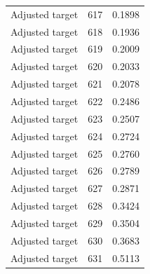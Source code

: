 \begin{table}[htbp]
\begin{tabular}{lll}
Adjusted target & 617 & 0.1898 \\
Adjusted target & 618 & 0.1936 \\
Adjusted target & 619 & 0.2009 \\
Adjusted target & 620 & 0.2033 \\
Adjusted target & 621 & 0.2078 \\
Adjusted target & 622 & 0.2486 \\
Adjusted target & 623 & 0.2507 \\
Adjusted target & 624 & 0.2724 \\
Adjusted target & 625 & 0.2760 \\
Adjusted target & 626 & 0.2789 \\
Adjusted target & 627 & 0.2871 \\
Adjusted target & 628 & 0.3424 \\
Adjusted target & 629 & 0.3504 \\
Adjusted target & 630 & 0.3683 \\
Adjusted target & 631 & 0.5113 \\
\bottomrule
\end{tabular}
\end{table}
